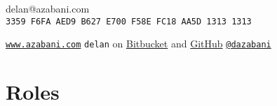 \documentclass[a4paper,12pt]{article}
\begin{document}
\hrulefill

\hspace{5mm}\begin{minipage}{110mm}
	                    {\Huge{delan\textcolor{lg}{@}azabani\textcolor{lg}{.com}}}
	\vspace{0.5em}  \\  {\texttt{\textcolor{lg}{3359 F6FA AED9 B627 E700 F58E FC18 AA5D 1313 1313}}}
\end{minipage}\hfill\begin{minipage}{50mm}
\end{minipage}\hspace{5mm}

\hrulefill

\vspace{-1ex}\hspace{5mm}\begin{minipage}{160mm}%
	\texttt{\href{https://www.azabani.com/}{www.azabani.com}}
	\hfill
	\texttt{delan} on
	\href{https://bitbucket.org/delan/}{Bitbucket} and
	\href{https://github.com/delan}{GitHub}
	\hfill
	\texttt{\href{https://twitter.com/dazabani}{@dazabani}}
\end{minipage}\hspace{5mm}\vspace{-2ex}

\hrulefill

\section*{Roles}
\end{document}
